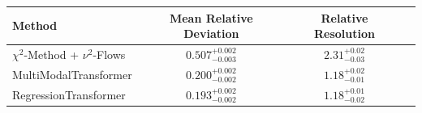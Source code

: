     \begin{tabular}{lccc}
        \toprule
        Method & Mean Relative Deviation & Relative Resolution \\
        \midrule
        $\chi^2$-Method + $\nu^2$-Flows & $0.507_{-0.003}^{+0.002}$ & $2.31_{-0.03}^{+0.02}$ \\
        MultiModalTransformer & $0.200_{-0.002}^{+0.002}$ & $1.18_{-0.01}^{+0.02}$ \\
        RegressionTransformer & $0.193_{-0.002}^{+0.002}$ & $1.18_{-0.02}^{+0.01}$ \\
        \bottomrule
    \end{tabular}